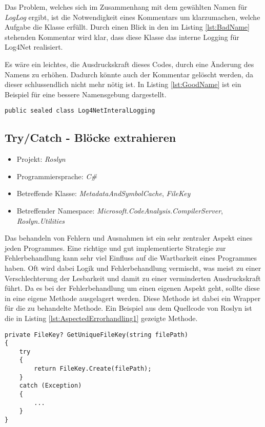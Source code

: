 \SuperPar Das Problem, welches sich im Zusammenhang mit dem gewählten Namen für \textit{LogLog} ergibt, ist die Notwendigkeit eines Kommentars um klarzumachen, welche  Aufgabe die Klasse erfüllt. Durch einen Blick in den im Listing \ref{lst:BadName} stehenden Kommentar wird klar, dass diese Klasse das interne Logging für Log4Net realisiert. 

Es wäre ein leichtes, die Ausdruckskraft dieses Codes, durch eine Änderung des Namens zu erhöhen. Dadurch könnte auch der Kommentar gelöscht werden, da dieser schlussendlich nicht mehr nötig ist. In Listing \ref{lst:GoodName} ist ein Beispiel für eine bessere Namensgebung dargestellt.

\begin{lstlisting}[language={[Sharp]C}, caption=Beispiele für bessere Namensgebung, label=lst:GoodName]
	public sealed class Log4NetInteralLogging
\end{lstlisting}

\subsection{Try/Catch - Blöcke extrahieren}
\begin{itemize}
	\item Projekt: \textit{Roslyn}
	\item Programmiersprache: \textit{C\#}
	\item Betreffende Klasse: \textit{MetadataAndSymbolCache}, \textit{FileKey}
	\item Betreffender Namespace: \textit{Microsoft.CodeAnalysis.CompilerServer}, \textit{Roslyn.Utilities}
\end{itemize}

\SuperPar Das behandeln von Fehlern und Ausnahmen ist ein sehr zentraler Aspekt eines jeden Programmes. Eine richtige und gut implementierte Strategie zur Fehlerbehandlung kann sehr viel Einfluss auf die Wartbarkeit eines Programmes haben. Oft wird dabei Logik und Fehlerbehandlung vermischt, was meist zu einer Verschlechterung der Lesbarkeit und damit zu einer verminderten Ausdruckskraft führt. Da es bei der Fehlerbehandlung um einen eigenen Aspekt geht, sollte diese in eine eigene Methode ausgelagert werden. Diese Methode ist dabei ein Wrapper für die zu behandelte Methode. Ein Beispiel aus dem Quellcode von Roslyn ist die in Listing \ref{lst:AspectedErrorhandling1} gezeigte Methode.

\begin{lstlisting}[language={[Sharp]C}, caption=Beispiele für getrennten Aspket der Fehlerbehandlung, label=lst:AspectedErrorhandling1]
private FileKey? GetUniqueFileKey(string filePath)
{
	try
	{
		return FileKey.Create(filePath);
	}
	catch (Exception)
	{
		...
	}
}
\end{lstlisting}

